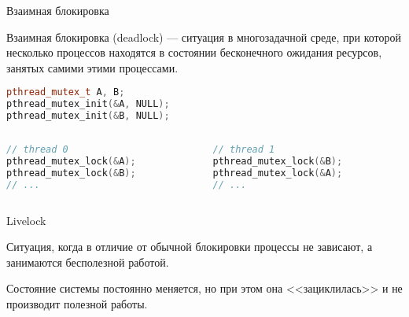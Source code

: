 \begin{frame}[fragile]{Взаимная блокировка}

Взаимная блокировка (\abbr deadlock) --- ситуация в многозадачной среде, при которой несколько процессов находятся в состоянии бесконечного ожидания ресурсов, занятых самими этими процессами.

\vfill

\begin{lstlisting}[language=C++,basicstyle=\ttfamily,keywordstyle=\color{blue},basicstyle=\footnotesize]
pthread_mutex_t A, B;
pthread_mutex_init(&A, NULL);
pthread_mutex_init(&B, NULL);
\end{lstlisting}

\begin{columns}[t]
    \begin{column}[T]{0.45\textwidth}
        \begin{lstlisting}[language=C++,basicstyle=\ttfamily,keywordstyle=\color{blue},basicstyle=\scriptsize]
// thread 0
pthread_mutex_lock(&A);
pthread_mutex_lock(&B);
// ...
        \end{lstlisting}
    \end{column}
    \begin{column}[T]{0.45\textwidth}
        \begin{lstlisting}[language=C++,basicstyle=\ttfamily,keywordstyle=\color{blue},basicstyle=\scriptsize]
// thread 1
pthread_mutex_lock(&B);
pthread_mutex_lock(&A);
// ...
        \end{lstlisting}
    \end{column}
\end{columns}

\end{frame}

\begin{frame}{Livelock}

Ситуация, когда в отличие от обычной блокировки процессы не зависают, а занимаются бесполезной работой.

Состояние системы постоянно меняется, но при этом она <<зациклилась>> и не производит полезной работы.

\end{frame}


